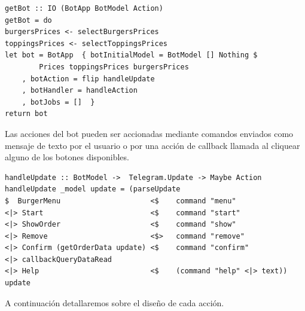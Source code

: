 \documentclass[a4paper,12pt]{article}
\begin{document}
\begin{verbatim}
getBot :: IO (BotApp BotModel Action)
getBot = do
burgersPrices <- selectBurgersPrices
toppingsPrices <- selectToppingsPrices
let bot = BotApp  { botInitialModel = BotModel [] Nothing $ 
		Prices toppingsPrices burgersPrices
	, botAction = flip handleUpdate
	, botHandler = handleAction
	, botJobs = []  }
return bot    
\end{verbatim}
	
Las acciones del bot pueden ser accionadas mediante comandos enviados como mensaje de texto por el usuario o por una acción de callback llamada al cliquear alguno de los botones disponibles.

\begin{verbatim}
handleUpdate :: BotModel ->  Telegram.Update -> Maybe Action
handleUpdate _model update = (parseUpdate
$  BurgerMenu                     <$    command "menu" 
<|> Start                         <$    command "start" 
<|> ShowOrder                     <$    command "show" 
<|> Remove                        <$>   command "remove"
<|> Confirm (getOrderData update) <$    command "confirm"
<|> callbackQueryDataRead
<|> Help                          <$    (command "help" <|> text)) update
\end{verbatim}

\pagebreak

A continuación detallaremos sobre el diseño de cada acción.
\end{document}
